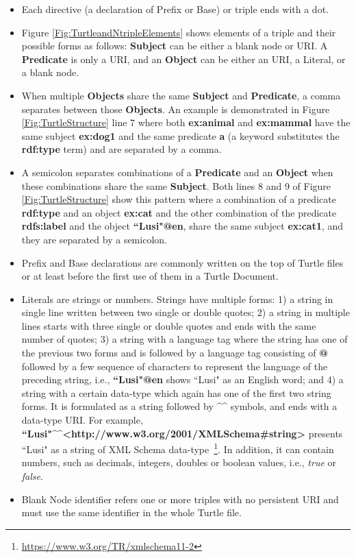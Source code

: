 \begin{itemize}
    \item Each directive (a declaration of Prefix or Base) or triple ends with a dot.
    \item Figure \ref{Fig:TurtleandNtripleElements} shows elements of a triple and their possible forms as follows: \textbf{Subject} can be either a blank node or URI. A \textbf{Predicate} is only a URI, and an \textbf{Object} can be either an URI, a Literal, or a blank node.
    \item When multiple \textbf{Objects} share the same \textbf{Subject} and \textbf{Predicate}, a comma separates between those \textbf{Objects}.
    An example is demonstrated in Figure \ref{Fig:TurtleStructure} line 7 where both \textbf{ex:animal} and \textbf{ex:mammal} have the same subject \textbf{ex:dog1} and the same predicate \textbf{a} (a keyword substitutes the \textbf{rdf:type} term) and are separated by a comma.
    
     \item A semicolon separates combinations of a \textbf{Predicate} and an \textbf{Object} when these combinations share the same \textbf{Subject}. 
     Both lines 8 and 9 of Figure \ref{Fig:TurtleStructure} show this pattern where a combination of a predicate \textbf{rdf:type} and an object \textbf{ex:cat} and the other combination of the predicate \textbf{rdfs:label} and the object \textbf{``Lusi"@en}, share the same subject \textbf{ex:cat1}, and they are separated by a semicolon.
     
      \item Prefix and Base declarations are commonly written on the top of Turtle files or at least before the first use of them in a Turtle Document.
      
     \item Literals are strings or numbers. 
     Strings have multiple forms: 1) a string in single line written between two single or double quotes; 2) a string in multiple lines starts with three single or double quotes and ends with the same number of quotes; 3) a string with a language tag where the string has one of the previous two forms and is followed by a language tag consisting of \textbf{@} followed by a few sequence of characters to represent the language of the preceding string, i.e., \textbf{``Lusi"@en} shows ``Lusi" as an English word; and 4) a string with a certain data-type which again has one of the first two string forms. It is formulated as a string followed by  \textbf{\textasciicircum\textasciicircum} symbols, and ends with a data-type URI.  For example,  \textbf{``Lusi"\textasciicircum\textasciicircum\textless http://www.w3.org/2001/XMLSchema\#string\textgreater} presents ``Lusi" as  a string of XML Schema data-type~\footnote{\url{https://www.w3.org/TR/xmlschema11-2}}.
     In addition, it can contain numbers, such as decimals, integers, doubles or boolean values, i.e., \emph{true} or \emph{false}.
     \item Blank Node identifier refers one or more triples with no persistent URI and must use the same identifier in the whole Turtle file.   
     
     
\end{itemize} 

